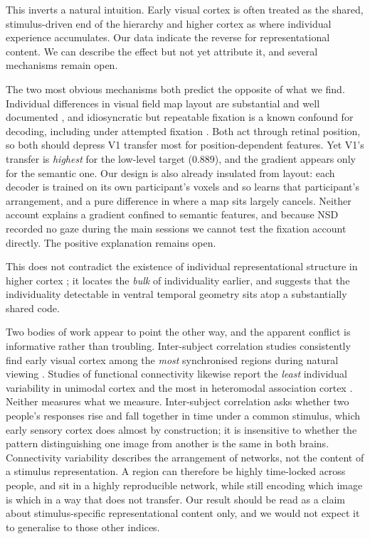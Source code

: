 \documentclass[11pt,a4paper]{article}
\begin{document}
This inverts a natural intuition. Early visual cortex is often treated as the
shared, stimulus-driven end of the hierarchy and higher cortex as where
individual experience accumulates. Our data indicate the reverse for
representational content. We can describe the effect but not yet attribute it,
and several mechanisms remain open.

The two most obvious mechanisms both predict the opposite of what we find.
Individual differences in visual field map layout are substantial and well
documented \citep{ribeiro2023,benson2018}, and idiosyncratic but repeatable
fixation is a known confound for decoding, including under attempted fixation
\citep{thielen2019,thielen2018}. Both act through retinal position, so both
should depress V1 transfer most for position-dependent features. Yet V1's
transfer is \emph{highest} for the low-level target (\num{0.889}), and the
gradient appears only for the semantic one. Our design is also already insulated
from layout: each decoder is trained on its own participant's voxels and so
learns that participant's arrangement, and a pure difference in where a map sits
largely cancels. Neither account explains a gradient confined to semantic
features, and because NSD recorded no gaze during the main sessions we cannot
test the fixation account directly. The positive explanation remains open.

This does not contradict the existence of individual representational structure
in higher cortex \citep{charest2014}; it locates the \emph{bulk} of individuality
earlier, and suggests that the individuality detectable in ventral temporal
geometry sits atop a substantially shared code.

Two bodies of work appear to point the other way, and the apparent conflict is
informative rather than troubling. Inter-subject correlation studies consistently
find early visual cortex among the \emph{most} synchronised regions during
natural viewing \citep{hasson2004,nastase2019}. Studies of functional
connectivity likewise report the \emph{least} individual variability in unimodal
cortex and the most in heteromodal association cortex
\citep{mueller2013,wang2015}. Neither measures what we measure. Inter-subject
correlation asks whether two people's responses rise and fall together in time
under a common stimulus, which early sensory cortex does almost by construction;
it is insensitive to whether the pattern distinguishing one image from another is
the same in both brains. Connectivity variability describes the arrangement of
networks, not the content of a stimulus representation. A region can therefore be
highly time-locked across people, and sit in a highly reproducible network, while
still encoding which image is which in a way that does not transfer. Our result
should be read as a claim about stimulus-specific representational content only,
and we would not expect it to generalise to those other indices.
\end{document}
